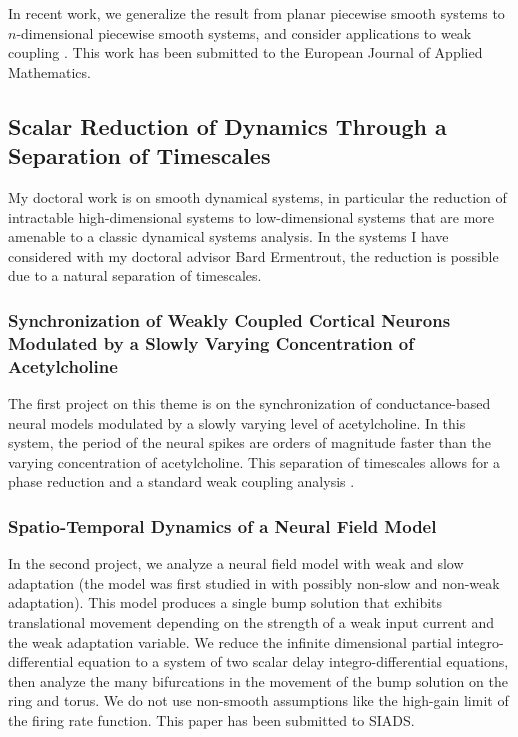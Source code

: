 \documentclass[a4paper,11pt]{article}
\begin{document}
In recent work, we generalize the result from planar piecewise smooth systems to $n$-dimensional piecewise smooth systems, and consider applications to weak coupling \cite{park2016infinitesimal}. This work has been submitted to the European Journal of Applied Mathematics.

\subsection{Scalar Reduction of Dynamics Through a Separation of Timescales}
My doctoral work is on smooth dynamical systems, in particular the reduction of intractable high-dimensional systems to low-dimensional systems that are more amenable to a classic dynamical systems analysis. In the systems I have considered with my doctoral advisor Bard Ermentrout, the reduction is possible due to a natural separation of timescales.

\subsubsection{Synchronization of Weakly Coupled Cortical Neurons Modulated by a Slowly Varying Concentration of Acetylcholine}
The first project on this theme is on the synchronization of conductance-based neural models modulated by a slowly varying level of acetylcholine. In this system, the period of the neural spikes are orders of magnitude faster than the varying concentration of acetylcholine. This separation of timescales allows for a phase reduction and a standard weak coupling analysis \cite{park2016weakly}.

\subsubsection{Spatio-Temporal Dynamics of a Neural Field Model}
In the second project, we analyze a neural field model with weak and slow adaptation (the model was first studied in \cite{pinto_ermentrout_2001_siam} with possibly non-slow and non-weak adaptation). This model produces a single bump solution that exhibits translational movement depending on the strength of a weak input current and the weak adaptation variable. We reduce the infinite dimensional partial integro-differential equation to a system of two scalar delay integro-differential equations, then analyze the many bifurcations in the movement of the bump solution on the ring and torus. We do not use non-smooth assumptions like the high-gain limit of the firing rate function. This paper has been submitted to SIADS.
\end{document}
